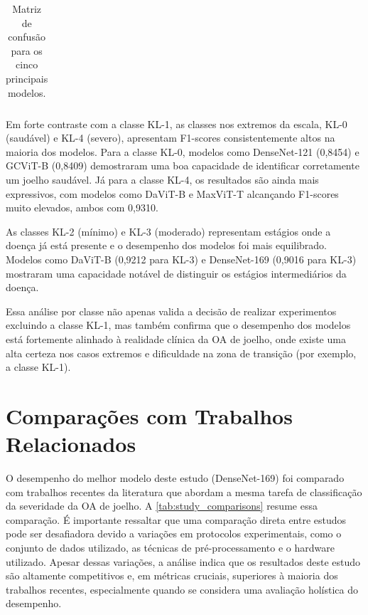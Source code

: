 \begin{table}[!htbp]
\begin{tabular}{|c|c|c|}
    \end{tabular}
    \caption{Matriz de confusão para os cinco principais modelos.}
    \label{tab:matrizes_confusao}
\end{table}

Em forte contraste com a classe KL-1, as classes nos extremos da escala, KL-0 (saudável) e KL-4 (severo), apresentam F1-scores consistentemente altos na maioria dos modelos. Para a classe KL-0, modelos como DenseNet-121 (0,8454) e GCViT-B (0,8409) demostraram uma boa capacidade de identificar corretamente um joelho saudável. Já para a classe KL-4, os resultados são ainda mais expressivos, com modelos como DaViT-B e MaxViT-T alcançando F1-scores muito elevados, ambos com 0,9310.

As classes KL-2 (mínimo) e KL-3 (moderado) representam estágios onde a doença já está presente e o desempenho dos modelos foi mais equilibrado. Modelos como DaViT-B (0,9212 para KL-3) e DenseNet-169 (0,9016 para KL-3) mostraram uma capacidade notável de distinguir os estágios intermediários da doença.

Essa análise por classe não apenas valida a decisão de realizar experimentos excluindo a classe KL-1, mas também confirma que o desempenho dos modelos está fortemente alinhado à realidade clínica da OA de joelho, onde existe uma alta certeza nos casos extremos e dificuldade na zona de transição (por exemplo, a classe KL-1).

\section{Comparações com Trabalhos Relacionados}

O desempenho do melhor modelo deste estudo (DenseNet-169) foi comparado com trabalhos recentes da literatura que abordam a mesma tarefa de classificação da severidade da OA de joelho. A \autoref{tab:study_comparisons} resume essa comparação. É importante ressaltar que uma comparação direta entre estudos pode ser desafiadora devido a variações em protocolos experimentais, como o conjunto de dados utilizado, as técnicas de pré-processamento e o hardware utilizado. Apesar dessas variações, a análise indica que os resultados deste estudo são altamente competitivos e, em métricas cruciais, superiores à maioria dos trabalhos recentes, especialmente quando se considera uma avaliação holística do desempenho.

